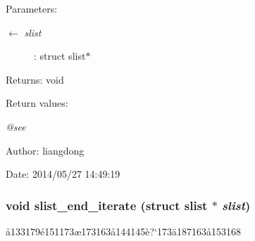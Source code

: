 \begin{Desc}
\item[Parameters:]
\begin{description}
\item[\mbox{$\leftarrow$} {\em slist}]: struct slist$\ast$ \end{description}
\end{Desc}
\begin{Desc}
\item[Returns:]void \end{Desc}
\begin{Desc}
\item[Return values:]
\begin{description}
\item[{\em @see}]\end{description}
\end{Desc}
\begin{Desc}
\item[Author:]liangdong \end{Desc}
\begin{Desc}
\item[Date:]2014/05/27 14:49:19 \end{Desc}
\subsubsection{\setlength{\rightskip}{0pt plus 5cm}void slist\_\-end\_\-iterate (struct slist $\ast$ {\em slist})}\label{slist_8h_a12}


\aa{}133179\'{e}151173\ae{}173163\aa{}144145\`{e}?`173\"{a}187163\aa{}153168 

